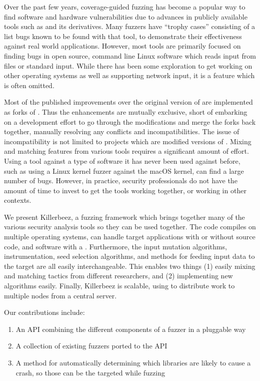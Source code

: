 Over the past few years, coverage-guided fuzzing has become a popular way to
find software and hardware vulnerabilities due to advances in publicly
available tools such as \AFL{}\cite{afl} and its derivatives.\cite{vanhauser} Many
fuzzers have ``trophy cases'' consisting of a list bugs known to be found with that tool, to
demonstrate their effectiveness against real world applications.  However, most
tools are primarily focused on finding bugs in open source, command line Linux
software which reads input from files or standard input. While there has been some
exploration to get \AFL{} working on other operating
systems\cite{aflosx}\cite{winafl} as well as supporting network
input,\cite{netafl}\cite{preeny} it is a feature which is often omitted.

Most of the published improvements over the original version of \AFL{} are
implemented as forks of
\AFL{}.\cite{aflfast}\cite{aflgo}\cite{fairfuzz}\cite{perffuzz}\cite{pythia}\cite{collafl}
Thus the enhancements are mutually exclusive, short of embarking on a
development effort to go through the modifications and merge the forks back
together, manually resolving any conflicts and incompatibilities.  The issue
of incompatibility is not limited to projects which are modified versions of
\AFL{}. Mixing and matching features from various tools requires a significant
amount of effort. Using a tool against a type of software it has never been
used against before, such as using a Linux kernel fuzzer against the macOS
kernel, can find a large number of bugs.  However, in practice, security
professionals do not have the amount of time to invest to get the tools working
together, or working in other contexts.

We present Killerbeez, a fuzzing framework which brings together many of the
various security analysis tools so they can be used together.  The code
compiles on multiple operating systems, can handle target applications with or
without source code, and software with a \GUI{}.
Furthermore, the input mutation algorithms, instrumentation, seed selection
algorithms, and methods for feeding input data to the target are all easily
interchangeable.  This enables two things (1) easily mixing and matching
tactics from different researchers, and (2) implementing new algorithms easily.
Finally, Killerbeez is scalable, using \BOINC{}\cite{boinc} to distribute work
to multiple nodes from a central server.

Our contributions include:
\begin{enumerate}[noitemsep]
\item An API combining the different components of a fuzzer in a pluggable way
\item A collection of existing fuzzers ported to the API
\item A method for automatically determining which libraries are likely to
	cause a crash, so those can be the targeted while fuzzing
\end{enumerate}
